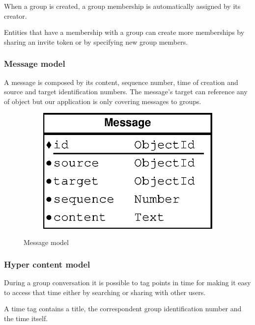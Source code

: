 When a group is created, a group membership is automatically assigned by its creator.

Entities that have a membership with a group can create more memberships by sharing an invite token or by specifying new group members.

\subsubsection{Message model}

A message is composed by its content, sequence number, time of creation and source and target identification numbers. The message's target can reference any of object but our application is only covering messages to groups.

\begin{figure}[H]
    \centering
    \begin{subfigure}[b]{0.25\textwidth}
    	\includegraphics[width=\textwidth]{figures/model_message}
    \end{subfigure}
    \caption{Message model}
\end{figure} 

\subsubsection{Hyper content model}

During a group conversation it is possible to tag points in time for making it easy to access that time either by searching or sharing with other users.

A time tag contains a title, the correspondent group identification number and the time itself.

